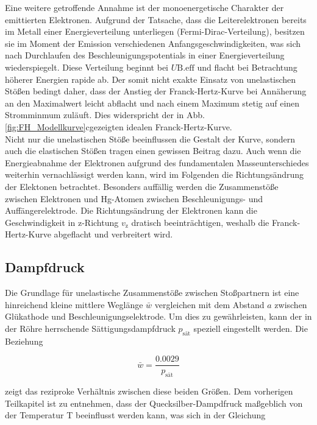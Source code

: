 Eine weitere getroffende Annahme ist der monoenergetische Charakter der emittierten Elektronen. Aufgrund der Tatsache, dass die Leiterelektronen bereits im Metall 
einer Energieverteilung unterliegen (Fermi-Dirac-Verteilung), besitzen sie im Moment der Emission verschiedenen Anfangsgeschwindigkeiten, was sich nach Durchlaufen 
des Beschleunigungspotentials in einer Energieverteilung wiederspiegelt. Diese Verteilung beginnt bei $U\text{B.eff}$ und flacht bei Betrachtung höherer Energien 
rapide ab. Der somit nicht exakte Einsatz von unelastischen Stößen bedingt daher, dass der Anstieg der Franck-Hertz-Kurve bei Annäherung an den Maximalwert leicht 
abflacht und nach einem Maximum stetig auf einen Stromminmum zuläuft. Dies widerspricht der in Abb. \ref{fig:FH_Modellkurve}cgezeigten idealen Franck-Hertz-Kurve. \\

\noindent Nicht nur die unelastischen Stöße beeinflussen die Gestalt der Kurve, sondern auch die elastischen Stößen tragen einen gewissen Beitrag dazu. Auch wenn die 
Energieabnahme der Elektronen aufgrund des fundamentalen Masseunterschiedes weiterhin vernachlässigt werden kann, wird im Folgenden die Richtungsändrung der Elektonen
betrachtet. Besonders auffällig werden die Zusammenstöße zwischen Elektronen und Hg-Atomen zwischen Beschleunigungs- und Auffängerelektrode. Die Richtungsändrung der 
Elektronen kann die Geschwindigkeit in z-Richtung $v_\text{z}$ dratisch beeinträchtigen, weshalb die Franck-Hertz-Kurve abgeflacht und verbreitert wird. 

\subsection*{Dampfdruck}

Die Grundlage für unelastische Zusammenstöße zwischen Stoßpartnern ist eine hinreichend kleine mittlere Weglänge $\bar{w}$ vergleichen mit dem Abstand $a$ zwischen 
Glükathode und Beschleunigungselektrode. Um dies zu gewährleisten, kann der in der Röhre herrschende Sättigungsdampfdruck $p_\text{sät}$ speziell eingestellt werden. 
Die Beziehung 

\begin{equation*}
    \bar{w} = \frac{0.0029}{p_\text{sät}}
\end{equation*}

\noindent zeigt das reziproke Verhältnis zwischen diese beiden Größen. Dem vorherigen Teilkapitel ist zu entnehmen, dass der Quecksilber-Dampdfruck maßgeblich von der 
Temperatur T beeinflusst werden kann, was sich in der Gleichung

